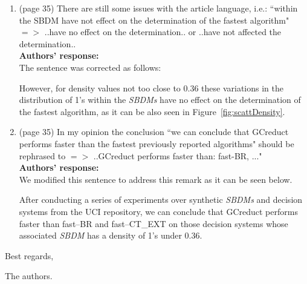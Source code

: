 \documentclass{letter}
\newtheorem{definition}{Definition}
\begin{document}
\begin{letter}{}
\begin{enumerate}
\begin{definition}
	\end{definition}	 
	
	\item (page 35) There are still some issues with the article language, i.e.: ``within the SBDM have not effect on the determination of the fastest algorithm" $=>$ ..have no effect on the determination.. or ..have not affected the determination..\\
	\textbf{Authors’ response:}\\
	The sentence was corrected as follows:
	
	However, for density values not too close to 0.36 these variations in the distribution of 1's within the \textit{SBDMs} have no effect on the determination of the fastest algorithm, as it can be also seen in Figure~\ref{fig:scattDensity}.
	
	\item (page 35) In my opinion the conclusion ``we can conclude that GCreduct performs faster than the fastest previously reported algorithms" should be rephrased to $=>$  ..GCreduct performs faster than: fast-BR, ..."\\
	\textbf{Authors’ response:}\\
	We modified this sentence to address this remark as it can be seen below.
	
	After conducting a series of experiments over synthetic \textit{SBDMs} and decision systems from the UCI repository, we can conclude that GCreduct performs faster than fast--BR and fast--CT\_EXT on those decision systems whose associated \textit{SBDM} has a density of 1's under 0.36.
	
  \end{enumerate}     
  
  Best regards,

  The authors.
  
\end{letter}

	
\end{document}
